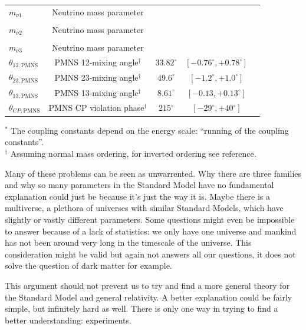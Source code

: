 \begin{table}[]
{\begin{tabular}{|l|c|c|c|c|}
\multirow{-2}{*}{$m_{\nu1}$} &\multirow{-2}{*}{Neutrino mass parameter}&&&\\
 &     &       & & \\
\multirow{-2}{*}{$m_{\nu2}$} &\multirow{-2}{*}{Neutrino mass parameter}&&&\\ 
 &   &       & & \\ 
\multirow{-2}{*}{$m_{\nu3}$} &\multirow{-2}{*}{Neutrino mass parameter}&&&\\
\hline
$\theta_{12,\textrm{PMNS}}$  &  PMNS 12-mixing angle$^\dagger$ & $33.82^{\circ}$ & $\left[-0.76^\circ, +0.78^\circ \right]$ & \cite{Esteban:2016qun,nufit2018}\\ \hline
$\theta_{23,\textrm{PMNS}}$  &  PMNS 23-mixing angle$^\dagger$ &
$49.6^{\circ}$ & $\left[-1.2^\circ, +1.0^\circ\right]$ & \cite{Esteban:2016qun,nufit2018}\\ \hline 
$\theta_{13,\textrm{PMNS}}$  &  PMNS 13-mixing angle$^\dagger$ &$8.61^{\circ}$ & $\left[-0.13,+0.13^\circ\right]$ & \cite{Esteban:2016qun,nufit2018}\\ \hline
$\theta_{CP,\textrm{PMNS}}$  &  PMNS CP violation phase$^\dagger$ &  $215^{\circ}$ & $\left[-29^\circ,+40^\circ \right]$ & \cite{Esteban:2016qun,nufit2018} \\ \hline
\end{tabular}%
}
$^*$ The coupling constants depend on the energy scale: ``running of the coupling constants''.\\
$^\dagger $ Assuming normal mass ordering, for inverted ordering see reference.
\end{table}
\vspace{2mm}


\noindent Many of these problems can be seen as unwarrented. Why there are three families and why so many parameters in the Standard Model have no fundamental explanation could just be because it's just the way it is. Maybe there is a multiverse, a plethora of universes with similar Standard Models, which have slightly or vastly different parameters. Some questions might even be impossible to answer because of a lack of statistics: we only have one universe and mankind has not been around very long in the timescale of the universe. This consideration might be valid but again not answers all our questions, it does not solve the question of dark matter for example.

This argument should not prevent us to try and find a more general theory for the Standard Model and general relativity. A better explanation could be fairly simple, but infinitely hard as well. There is only one way in trying to find a better understanding: experiments.

